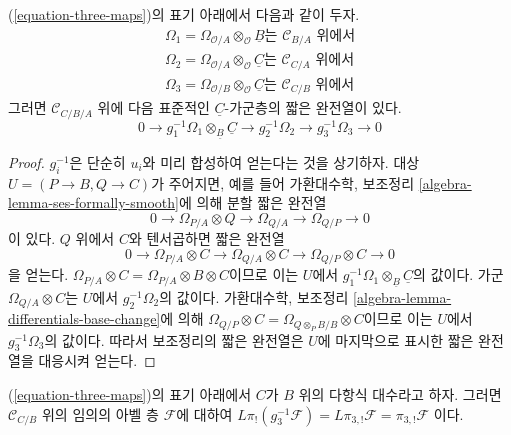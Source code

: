 \begin{lemma}
\label{lemma-triangle-ses}
(\ref{equation-three-maps})의 표기 아래에서 다음과 같이 두자.
$$
\begin{matrix}
\Omega_1 = \Omega_{\mathcal{O}/A} \otimes_\mathcal{O} \underline{B}
\text{는 }\mathcal{C}_{B/A}\text{ 위에서} \\
\Omega_2 = \Omega_{\mathcal{O}/A} \otimes_\mathcal{O} \underline{C}
\text{는 }\mathcal{C}_{C/A}\text{ 위에서} \\
\Omega_3 = \Omega_{\mathcal{O}/B} \otimes_\mathcal{O} \underline{C}
\text{는 }\mathcal{C}_{C/B}\text{ 위에서}
\end{matrix}
$$
그러면 $\mathcal{C}_{C/B/A}$ 위에 다음 표준적인
$\underline{C}$-가군층의 짧은 완전열이 있다.
$$
0 \to g_1^{-1}\Omega_1 \otimes_{\underline{B}} \underline{C} \to
g_2^{-1}\Omega_2 \to
g_3^{-1}\Omega_3 \to 0
$$
\end{lemma}

\begin{proof}
$g_i^{-1}$은 단순히 $u_i$와 미리 합성하여 얻는다는 것을 상기하자. 대상
$U=(P\to B,Q\to C)$가 주어지면, 예를 들어 가환대수학, 보조정리
\ref{algebra-lemma-ses-formally-smooth}에 의해 분할 짧은 완전열
$$
0 \to \Omega_{P/A} \otimes Q \to \Omega_{Q/A} \to \Omega_{Q/P} \to 0
$$
이 있다. $Q$ 위에서 $C$와 텐서곱하면 짧은 완전열
$$
0 \to \Omega_{P/A} \otimes C \to \Omega_{Q/A} \otimes C \to
\Omega_{Q/P} \otimes C \to 0
$$
을 얻는다. $\Omega_{P/A}\otimes C=\Omega_{P/A}\otimes B\otimes C$이므로
이는 $U$에서 $g_1^{-1}\Omega_1\otimes_{\underline{B}}\underline{C}$의
값이다. 가군 $\Omega_{Q/A}\otimes C$는 $U$에서 $g_2^{-1}\Omega_2$의
값이다. 가환대수학, 보조정리
\ref{algebra-lemma-differentials-base-change}에 의해
$\Omega_{Q/P}\otimes C=\Omega_{Q\otimes_PB/B}\otimes C$이므로 이는
$U$에서 $g_3^{-1}\Omega_3$의 값이다. 따라서 보조정리의 짧은 완전열은
$U$에 마지막으로 표시한 짧은 완전열을 대응시켜 얻는다.
\end{proof}

\begin{lemma}
\label{lemma-polynomial-on-top}
(\ref{equation-three-maps})의 표기 아래에서 $C$가 $B$ 위의 다항식
대수라고 하자. 그러면 $\mathcal{C}_{C/B}$ 위의 임의의 아벨 층
$\mathcal{F}$에 대하여
$L\pi_!(g_3^{-1}\mathcal{F}) = L\pi_{3, !}\mathcal{F} = \pi_{3, !}\mathcal{F}$
이다.
\end{lemma}

